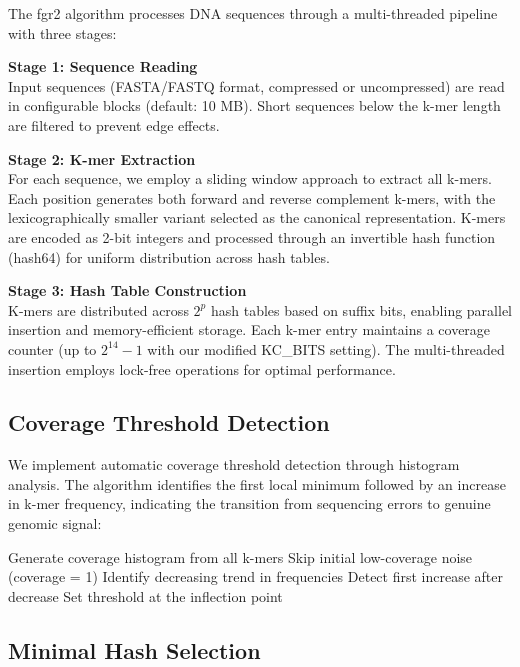 \documentclass[12pt,a4paper]{article}
\begin{document}
The fgr2 algorithm processes DNA sequences through a multi-threaded pipeline with three stages:

\textbf{Stage 1: Sequence Reading}\\
Input sequences (FASTA/FASTQ format, compressed or uncompressed) are read in configurable blocks (default: 10 MB). Short sequences below the k-mer length are filtered to prevent edge effects.

\textbf{Stage 2: K-mer Extraction}\\
For each sequence, we employ a sliding window approach to extract all k-mers. Each position generates both forward and reverse complement k-mers, with the lexicographically smaller variant selected as the canonical representation. K-mers are encoded as 2-bit integers and processed through an invertible hash function (hash64) for uniform distribution across hash tables.

\textbf{Stage 3: Hash Table Construction}\\
K-mers are distributed across $2^p$ hash tables based on suffix bits, enabling parallel insertion and memory-efficient storage. Each k-mer entry maintains a coverage counter (up to $2^{14}-1$ with our modified KC\_BITS setting). The multi-threaded insertion employs lock-free operations for optimal performance.

\subsection{Coverage Threshold Detection}

We implement automatic coverage threshold detection through histogram analysis. The algorithm identifies the first local minimum followed by an increase in k-mer frequency, indicating the transition from sequencing errors to genuine genomic signal:

\begin{algorithm}
\caption{Automatic Coverage Threshold Detection}
\begin{algorithmic}[1]
\STATE Generate coverage histogram from all k-mers
\STATE Skip initial low-coverage noise (coverage = 1)
\STATE Identify decreasing trend in frequencies
\STATE Detect first increase after decrease
\STATE Set threshold at the inflection point
\end{algorithmic}
\end{algorithm}

\subsection{Minimal Hash Selection}
\end{document}
